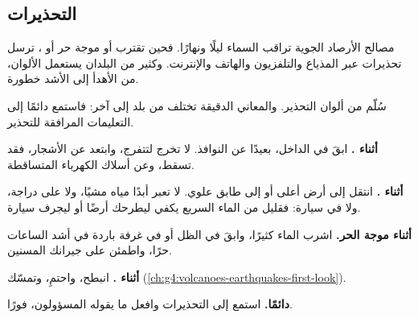 \subsection*{التحذيرات}

مصالح الأرصاد الجوية تراقب السماء ليلًا ونهارًا. فحين تقترب  أو موجة حر أو
، ترسل تحذيرات عبر المذياع والتلفزيون والهاتف
والإنترنت. وكثير من البلدان يستعمل الألوان، من الأهدأ إلى الأشد
خطورة.

\begin{omfigure}

{\small سُلّم من ألوان التحذير. والمعاني الدقيقة تختلف من
بلد إلى آخر: فاستمع دائمًا إلى التعليمات المرافقة
للتحذير.}
\end{omfigure}

\begin{safety}
\textbf{أثناء .} ابقَ في الداخل، بعيدًا عن النوافذ. لا تخرج
لتتفرج، وابتعد عن الأشجار، فقد تسقط، وعن أسلاك الكهرباء
المتساقطة.

\textbf{أثناء .} انتقل إلى أرض أعلى أو إلى طابق علوي. لا تعبر
أبدًا مياه  مشيًا، ولا على دراجة، ولا في سيارة: فقليل من الماء السريع
يكفي ليطرحك أرضًا أو ليجرف سيارة.

\textbf{أثناء موجة الحر.} اشرب الماء كثيرًا، وابقَ في الظل أو في غرفة
باردة في أشد الساعات حرًا، واطمئن على جيرانك المسنين.

\textbf{أثناء .} انبطح، واحتمِ، وتمسّك
(\cref{ch:g4:volcanoes-earthquakes-first-look}).

\textbf{دائمًا.} استمع إلى التحذيرات وافعل ما يقوله المسؤولون،
فورًا.
\end{safety}

